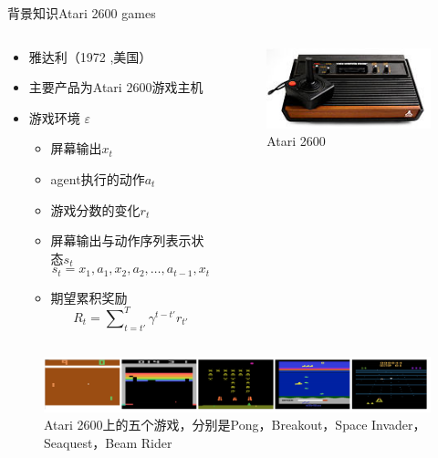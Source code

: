 \documentclass[10pt]{beamer}
\begin{document}
	\begin{frame}{背景知识}{Atari 2600 games}
		\begin{columns}
			\begin{column}{.8\linewidth}
				\begin{itemize}
					\item 雅达利（1972 ,美国）
					\item 主要产品为Atari 2600游戏主机
					\item 游戏环境 $\varepsilon$
					\begin{itemize}
						\item 屏幕输出$x_t$
						\item agent执行的动作$a_t$
						\item 游戏分数的变化$r_t$
						\item 屏幕输出与动作序列表示状态$s_t$
						\[s_t=x_1,a_1,x_2,a_2,\dots,a_{t-1},x_t \]
						\item 期望累积奖励
						\[R_t=\sum\nolimits_{t=t'}^{T}\gamma^{t-t'}r_{t'} \]
					\end{itemize}
				\end{itemize}
			\end{column}
			\begin{column}{.2\linewidth}
				\begin{figure}
					\centering
					\includegraphics[width=0.6\linewidth]{pictures/atari2600}
					\caption{Atari 2600}
					\label{fig:atari2600}
				\end{figure}
			\end{column}
		\end{columns}
	
		\vspace{-1em}
		\begin{figure}
			\centering
			\includegraphics[width=0.7\linewidth]{pictures/atari2600-games}
			\caption{Atari 2600上的五个游戏，分别是Pong，Breakout，Space Invader，Seaquest，Beam Rider}
			\label{fig:atari2600-games}
		\end{figure}
	\end{frame}
\end{document}

